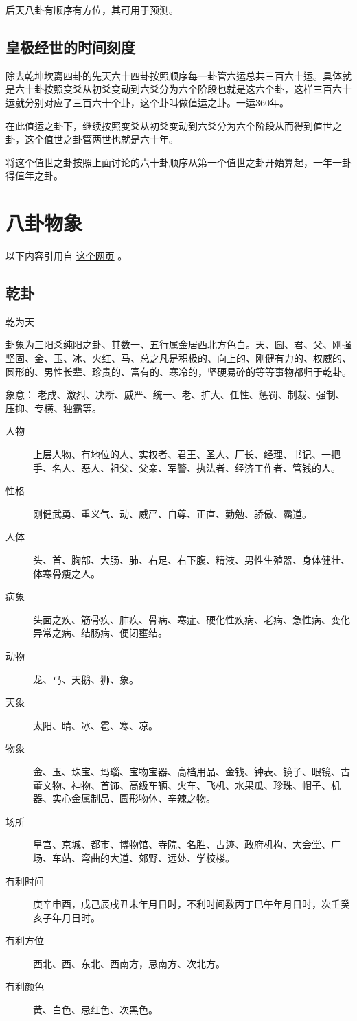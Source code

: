 \documentclass[12pt,oneside]{book}
\begin{document}
后天八卦有顺序有方位，其可用于预测。


\section{皇极经世的时间刻度}
除去乾坤坎离四卦的先天六十四卦按照顺序每一卦管六运总共三百六十运。具体就是六十卦按照变爻从初爻变动到六爻分为六个阶段也就是这六个卦，这样三百六十运就分别对应了三百六十个卦，这个卦叫做值运之卦。一运360年。

在此值运之卦下，继续按照变爻从初爻变动到六爻分为六个阶段从而得到值世之卦，这个值世之卦管两世也就是六十年。

将这个值世之卦按照上面讨论的六十卦顺序从第一个值世之卦开始算起，一年一卦得值年之卦。

\chapter{八卦物象}
以下内容引用自 \href{https://www.douban.com/note/684840565/}{这个网页} 。

\section{乾卦}
乾为天

卦象为三阳爻纯阳之卦、其数一、五行属金居西北方色白。天、圆、君、父、刚强坚固、金、玉、冰、火红、马、总之凡是积极的、向上的、刚健有力的、权威的、圆形的、男性长辈、珍贵的、富有的、寒冷的，坚硬易碎的等等事物都归于乾卦。

象意： 老成、激烈、决断、威严、统一、老、扩大、任性、惩罚、制裁、强制、压抑、专横、独霸等。


\begin{description}
\item[人物] 上层人物、有地位的人、实权者、君王、圣人、厂长、经理、书记、一把手、名人、恶人、祖父、父亲、军警、执法者、经济工作者、管钱的人。
\item[性格] 刚健武勇、重义气、动、威严、自尊、正直、勤勉、骄傲、霸道。
\item[人体] 头、首、胸部、大肠、肺、右足、右下腹、精液、男性生殖器、身体健壮、体寒骨瘦之人。
\item[病象] 头面之疾、筋骨疾、肺疾、骨病、寒症、硬化性疾病、老病、急性病、变化异常之病、结肠病、便闭壅结。
\item[动物] 龙、马、天鹅、狮、象。
\item[天象] 太阳、晴、冰、雹、寒、凉。
\item[物象] 金、玉、珠宝、玛瑙、宝物宝器、高档用品、金钱、钟表、镜子、眼镜、古董文物、神物、首饰、高级车辆、火车、飞机、水果瓜、珍珠、帽子、机器、实心金属制品、圆形物体、辛辣之物。
\item[场所] 皇宫、京城、都市、博物馆、寺院、名胜、古迹、政府机构、大会堂、广场、车站、弯曲的大道、郊野、远处、学校楼。
\item[有利时间] 庚辛申酉，戊己辰戌丑未年月日时，不利时间数丙丁巳午年月日时，次壬癸亥子年月日时。
\item[有利方位] 西北、西、东北、西南方，忌南方、次北方。
\item[有利颜色] 黄、白色、忌红色、次黑色。
\end{description}
\end{document}
